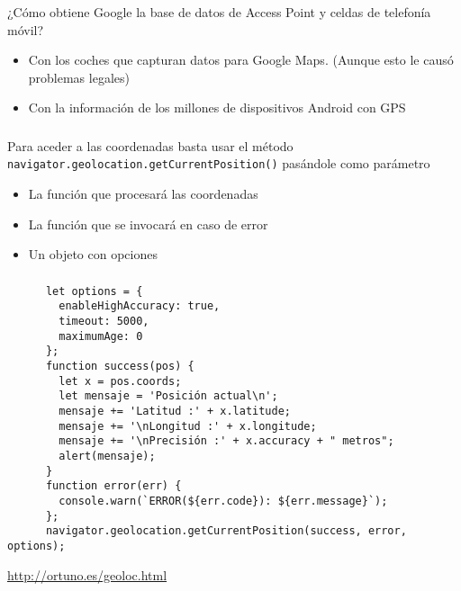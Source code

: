 \documentclass[ucs]{beamer}
\begin{document}
\begin{frame}[fragile]
\frametitle{}
¿Cómo obtiene Google la base de datos de Access Point y celdas de
telefonía móvil?
\begin{itemize}
\item
Con los coches que capturan datos para Google Maps. (Aunque esto le causó
problemas legales)

\item
Con la información de los millones de dispositivos Android con GPS
\end{itemize}

\end{frame}



\begin{frame}[fragile]
\frametitle{}
Para aceder a las coordenadas basta usar el método
\verb|navigator.geolocation.getCurrentPosition()|
pasándole como parámetro

\begin{itemize}
\item
La función que procesará las coordenadas

\item
La función que se invocará en caso de error

\item
Un objeto con opciones
\end{itemize}

\end{frame}

\begin{frame}[fragile]
\frametitle{}

  \begin{scriptsize}
  \begin{verbatim}
      let options = {
        enableHighAccuracy: true,
        timeout: 5000,
        maximumAge: 0
      };
      function success(pos) {
        let x = pos.coords;
        let mensaje = 'Posición actual\n';
        mensaje += 'Latitud :' + x.latitude;
        mensaje += '\nLongitud :' + x.longitude;
        mensaje += '\nPrecisión :' + x.accuracy + " metros";
        alert(mensaje);
      }
      function error(err) {
        console.warn(`ERROR(${err.code}): ${err.message}`);
      };
      navigator.geolocation.getCurrentPosition(success, error, options);
  \end{verbatim}
  \end{scriptsize}
\begin{tiny}
\begin{flushright}
\url{http://ortuno.es/geoloc.html}
\end{flushright}
\end{tiny}
\end{frame}
\end{document}
